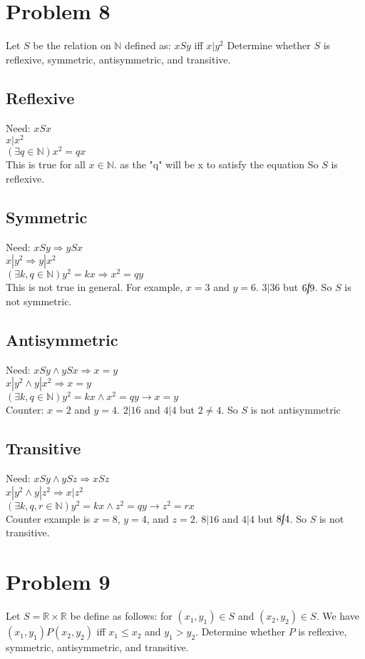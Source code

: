 \documentclass{article}
\begin{document}
\section*{Problem 8}
Let $S$ be the relation on $\mathbb{N}$ defined as: $x S y$ iff $x|y^2$ Determine whether $S$ is reflexive, symmetric, antisymmetric, and transitive.
\subsection*{Reflexive}
Need: $x S x$ \\
$x | x^2$ \\
$(\exists q \in \mathbb{N} )x^2 = qx$ \\
This is true for all $x \in \mathbb{N}$. as the "q" will be x to satisfy the equation So $S$ is reflexive.
\subsection*{Symmetric}
Need: $x S y \Rightarrow y S x$ \\
$x | y^2 \Rightarrow y | x^2$ \\
$(\exists k,q \in \mathbb{N} )y^2 = kx \Rightarrow x^2 = qy$ \\
This is not true in general. For example, $x=3$ and $y=6$. $3|36$ but $6 \cancel{|} 9$. So $S$ is not symmetric.
\subsection*{Antisymmetric}
Need: $x S y \land y S x \Rightarrow x = y$ \\
$x | y^2 \land y | x^2 \Rightarrow x = y$ \\
$(\exists k,q \in \mathbb{N} )y^2 = kx \land x^2 = qy \rightarrow x = y$\\
Counter: $x = 2$ and $y = 4$. $2|16$ and $4|4$ but $2 \neq 4$. So $S$ is not antisymmetric
\subsection*{Transitive}
Need: $x S y \land y S z \Rightarrow x S z$ \\
$x | y^2 \land y | z^2 \Rightarrow x | z^2$ \\
$(\exists k,q,r \in \mathbb{N} )y^2 = kx \land z^2 = qy \rightarrow z^2 = rx$\\
Counter example is $x = 8$, $y = 4$, and $z = 2$. $8|16$ and $4|4$ but $8 \cancel{|} 4$. So $S$ is not transitive.
\section*{Problem 9}
Let $S = \mathbb{R} \times \mathbb{R}$ be define as follows: for $(x_1, y_1) \in S$ and $(x_2, y_2) \in S$. We have $(x_1, y_1) P (x_2, y_2)$ iff $x_1 \leq x_2$ and $y_1 > y_2$. Determine whether $P$ is reflexive, symmetric, antisymmetric, and transitive.
\end{document}
